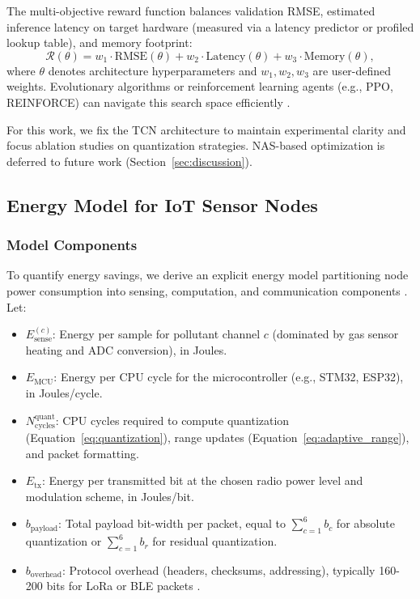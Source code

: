The multi-objective reward function balances validation RMSE, estimated inference latency on target hardware (measured via a latency predictor or profiled lookup table), and memory footprint:
\begin{equation}
\mathcal{R}(\theta) = w_1 \cdot \text{RMSE}(\theta) + w_2 \cdot \text{Latency}(\theta) + w_3 \cdot \text{Memory}(\theta),
\label{eq:nas_reward}
\end{equation}
where $\theta$ denotes architecture hyperparameters and $w_1, w_2, w_3$ are user-defined weights. Evolutionary algorithms or reinforcement learning agents (e.g., PPO, REINFORCE) can navigate this search space efficiently \cite{baker2016nas, zoph2017nas}.

For this work, we fix the TCN architecture to maintain experimental clarity and focus ablation studies on quantization strategies. NAS-based optimization is deferred to future work (Section~\ref{sec:discussion}).

\subsection{Energy Model for IoT Sensor Nodes}

\subsubsection{Model Components}

To quantify energy savings, we derive an explicit energy model partitioning node power consumption into sensing, computation, and communication components \cite{khan2024artificial}. Let:

\begin{itemize}
\item $E_{\text{sense}}^{(c)}$: Energy per sample for pollutant channel $c$ (dominated by gas sensor heating and ADC conversion), in Joules.
\item $E_{\text{MCU}}$: Energy per CPU cycle for the microcontroller (e.g., STM32, ESP32), in Joules/cycle.
\item $N_{\text{cycles}}^{\text{quant}}$: CPU cycles required to compute quantization (Equation~\eqref{eq:quantization}), range updates (Equation~\eqref{eq:adaptive_range}), and packet formatting.
\item $E_{\text{tx}}$: Energy per transmitted bit at the chosen radio power level and modulation scheme, in Joules/bit.
\item $b_{\text{payload}}$: Total payload bit-width per packet, equal to $\sum_{c=1}^{6} b_c$ for absolute quantization or $\sum_{c=1}^{6} b_r$ for residual quantization.
\item $b_{\text{overhead}}$: Protocol overhead (headers, checksums, addressing), typically 160-200 bits for LoRa or BLE packets \cite{przystupa2025ensuring}.
\end{itemize}

